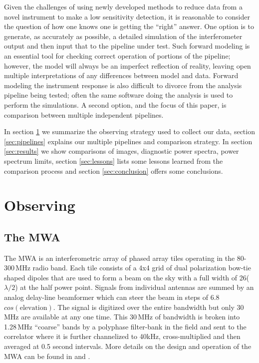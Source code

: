 \documentclass[twolcolumn,iop]{emulateapj}
\begin{document}
Given the challenges of using newly developed methods to reduce data from a novel instrument to make a low sensitivity detection, it is reasonable to consider the question of how one knows one is getting the ``right'' answer.  One option is to generate, as accurately as possible, a detailed simulation of the interferometer output and then input that to the pipeline under test.  Such forward modeling is an essential tool for checking correct operation of portions of the pipeline; however, the model will always be an imperfect reflection of reality, leaving open multiple interpretations of any differences between model and data.  Forward modeling the instrument response is also difficult to divorce from the analysis pipeline being tested; often the same software doing the analysis is used to perform the simulations. A second option, and the focus of this paper, is comparison between multiple independent pipelines.


In section \ref{sec:observing} we summarize the observing strategy used to collect our data, section \ref{sec:pipelines} explains our multiple pipelines and comparison strategy. In section \ref{sec:results} we show comparisons of images, diagnostic power spectra, power spectrum limits, section \ref{sec:lessons} lists some lessons learned from the comparison process and section \ref{sec:conclusion} offers some conclusions.



\section{Observing}
\label{sec:observing}
\subsection{The MWA}
The MWA is an interferometric array of phased array tiles operating in the 80-300\,MHz radio band. Each tile consists of a 4x4 grid of dual polarization bow-tie shaped dipoles that are used to form a beam on the sky with a full width of 26\arcdeg($\lambda/2$) at the half power point. Signals from individual antennas are summed by an analog delay-line beamformer which can steer the beam in steps of 6.8\arcdeg$cos(\textrm{elevation})$.  The signal is digitized over the entire bandwidth but only 30\,MHz are available at any one time.  This 30\,MHz of bandwidth is broken into 1.28\,MHz ``coarse'' bands by a polyphase filter-bank in the field and sent to the correlator \citep{Ord:2015PASA...32....6O} where it is further channelized to 40kHz, cross-multiplied and then averaged at 0.5 second intervals.  More details on the design and operation of the MWA can be found in \cite{Lonsdale:2009p7913} and \cite{Tingay:2013p9022}.
\end{document}
